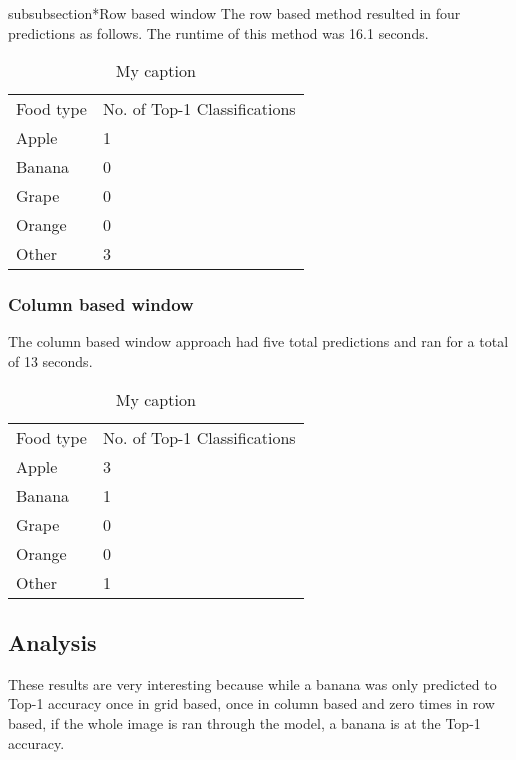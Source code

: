 subsubsection*{Row based window}
The row based method resulted in four predictions as follows. The runtime of
this method was 16.1 seconds.

\begin{table}[]
	\centering
	\caption{My caption}
	\label{my-label}
	\begin{tabular}{ll}
		Food type & No. of Top-1 Classifications \\
		Apple     & 1                      \\
		Banana    & 0                      \\
		Grape     & 0                      \\
		Orange    & 0                      \\
		Other     & 3                     
	\end{tabular}
\end{table}

\subsubsection*{Column based window}
The column based window approach had five total predictions and ran for a total
of 13 seconds.

\begin{table}[]
	\centering
	\caption{My caption}
	\label{my-label}
	\begin{tabular}{ll}
		Food type & No. of Top-1 Classifications \\
		Apple     & 3                      \\
		Banana    & 1                      \\
		Grape     & 0                      \\
		Orange    & 0                      \\
		Other     & 1                     
	\end{tabular}
\end{table}
\subsection*{Analysis}
These results are very interesting because while a banana was only predicted to
Top-1 accuracy once in grid based, once in column based and zero times in row
based, if the whole image is ran through the model, a banana is at the Top-1 accuracy.
























